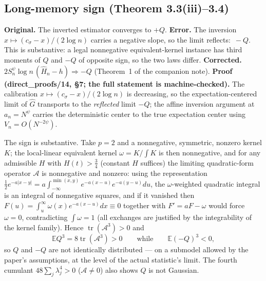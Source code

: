 \documentclass[11pt]{article}
\theoremstyle{definition}
\theoremstyle{remark}
\newcommand{\statustag}[1]{%
  \par\nobreak\begingroup\footnotesize\itshape\raggedleft #1\par\endgroup}
\newcommand{\Wlean}{[Lean]}
\begin{document}
\smallskip{}

\subsection{Long-memory sign (Theorem 3.3(iii)--3.4)}\label{sec:sign}

\noindent\textbf{Original.} The inverted estimator converges to $+Q$.
\textbf{Error.} The inversion $x\mapsto(c_\sigma-x)/(2\log n)$ carries a
negative slope, so the limit reflects: $\,-Q$. This is substantive: a legal
nonnegative equivalent-kernel instance has third moments of $Q$ and $-Q$ of
opposite sign, so the two laws differ.
\textbf{Corrected.}
$2S_n^{\psi}\log n\,(\widehat H_n-h)\Rightarrow -Q$
(Theorem~1 of the companion note).
\textbf{Proof (direct\_proofs/14, \S7; the full statement is machine-checked).}
The calibration $x\mapsto(c_\sigma-x)/(2\log n)$ is decreasing, so the
expectation-centered limit of $\widehat G$ transports to the \emph{reflected}
limit $-Q$; the affine inversion argument at $a_n=N^{\psi}$ carries the
deterministic center to the true expectation center using
$V_n=O(N^{-2\psi})$.

The sign is substantive. Take $p=2$ and a nonnegative, symmetric, nonzero
kernel $K$; the local-linear equivalent kernel $\omega=K/\int K$ is then
nonnegative, and for any admissible $H$ with $H(t)>\frac34$ (constant $H$
suffices) the limiting quadratic-form operator $\mathcal A$ is nonnegative
and nonzero: using the representation
$\tfrac12e^{-a|x-y|}=a\int_{-\infty}^{\min(x,y)}e^{-a(x-u)}e^{-a(y-u)}du$,
the $\omega$-weighted quadratic integral is an integral of nonnegative
squares, and if it vanished then
$F(u)=\int_u^\infty\omega(x)e^{-a(x-u)}dx\equiv0$ together with
$F'=aF-\omega$ would force $\omega=0$, contradicting $\int\omega=1$
(all exchanges are justified by the integrability of the kernel family).
Hence $\operatorname{tr}(\mathcal A^3)>0$ and
\[
\mathbb EQ^3=8\operatorname{tr}(\mathcal A^3)>0
\qquad\text{while}\qquad
\mathbb E(-Q)^3<0,
\]
so $Q$ and $-Q$ are not identically distributed --- on a submodel allowed by
the paper's assumptions, at the level of the actual statistic's limit. The
fourth cumulant $48\sum_j\lambda_j^4>0$ ($\mathcal A\neq0$) also shows $Q$ is
not Gaussian.
\statustag{\Wlean}

\smallskip{}
\end{document}
